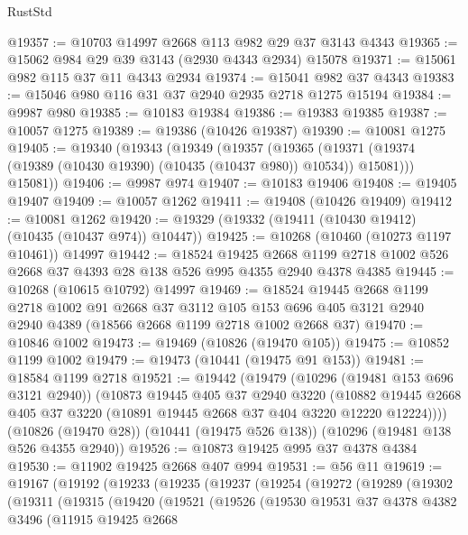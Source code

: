 \begin{lexlean}{RustStd}
\begin{coremodule}
@19357 := @10703 @14997 @2668 @113 @982 @29 @37 @3143 @4343
@19365 := @15062 @984 @29 @39 @3143 (@2930 @4343 @2934) @15078
@19371 := @15061 @982 @115 @37 @11 @4343 @2934
@19374 := @15041 @982 @37 @4343
@19383 := @15046 @980 @116 @31 @37 @2940 @2935 @2718 @1275 @15194
@19384 := @9987 @980
@19385 := @10183 @19384
@19386 := @19383 @19385
@19387 := @10057 @1275
@19389 := @19386 (@10426 @19387)
@19390 := @10081 @1275
@19405 := @19340
    (@19343
      (@19349
        (@19357
          (@19365 (@19371 (@19374 (@19389 (@10430 @19390) (@10435 (@10437 @980)) @10534)) @15081)))
        @15081))
@19406 := @9987 @974
@19407 := @10183 @19406
@19408 := @19405 @19407
@19409 := @10057 @1262
@19411 := @19408 (@10426 @19409)
@19412 := @10081 @1262
@19420 := @19329 (@19332 (@19411 (@10430 @19412) (@10435 (@10437 @974)) @10447))
@19425 := @10268 (@10460 (@10273 @1197 @10461)) @14997
@19442 := @18524
    @19425
    @2668
    @1199
    @2718
    @1002
    @526
    @2668
    @37
    @4393
    @28
    @138
    @526
    @995
    @4355
    @2940
    @4378
    @4385
@19445 := @10268 (@10615 @10792) @14997
@19469 := @18524
    @19445
    @2668
    @1199
    @2718
    @1002
    @91
    @2668
    @37
    @3112
    @105
    @153
    @696
    @405
    @3121
    @2940
    @2940
    @4389
    (@18566 @2668 @1199 @2718 @1002 @2668 @37)
@19470 := @10846 @1002
@19473 := @19469 (@10826 (@19470 @105))
@19475 := @10852 @1199 @1002
@19479 := @19473 (@10441 (@19475 @91 @153))
@19481 := @18584 @1199 @2718
@19521 := @19442
    (@19479
      (@10296 (@19481 @153 @696 @3121 @2940))
      (@10873
        @19445
        @405
        @37
        @2940
        @3220
        (@10882 @19445 @2668 @405 @37 @3220 (@10891 @19445 @2668 @37 @404 @3220 @12220 @12224))))
    (@10826 (@19470 @28))
    (@10441 (@19475 @526 @138))
    (@10296 (@19481 @138 @526 @4355 @2940))
@19526 := @10873 @19425 @995 @37 @4378 @4384
@19530 := @11902 @19425 @2668 @407 @994
@19531 := @56 @11
@19619 := @19167
    (@19192
      (@19233
        (@19235
          (@19237
            (@19254
              (@19272
                (@19289
                  (@19302
                    (@19311
                      (@19315
                        (@19420
                          (@19521
                            (@19526
                              (@19530
                                @19531
                                @37
                                @4378
                                @4382
                                @3496
                                (@11915
                                  @19425
                                  @2668

\end{coremodule}
\end{lexlean}
